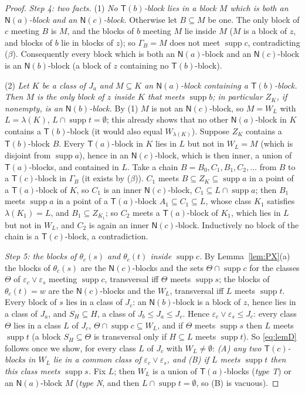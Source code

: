 \documentclass[11pt]{amsart}
\theoremstyle{definition}
\newcommand{\supp}{\operatorname{supp}}
\newcommand{\T}{\mathsf{T}}
\newcommand{\N}{\mathsf{N}}
\begin{document}
\begin{proof}
\emph{Step 4: two facts.} (1) \emph{No $\T(b)$-block lies in a block $M$ which is both an $\N(a)$-block and an $\N(c)$-block.} Otherwise let $B\subseteq M$ be one. The only block of $c$ meeting $B$ is $M$, and the blocks of $b$ meeting $M$ lie inside $M$ ($M$ is a block of $z$, and blocks of $b$ lie in blocks of $z$); so $\Gamma_B=M$ does not meet $\supp c$, contradicting ($\beta$). Consequently every block which is both an $\N(a)$-block and an $\N(c)$-block is an $\N(b)$-block (a block of $z$ containing no $\T(b)$-block).

(2) \emph{Let $K$ be a class of $J_a$ and $M\subseteq K$ an $\N(a)$-block containing a $\T(b)$-block. Then $M$ is the only block of $z$ inside $K$ that meets $\supp b$; in particular $Z_K$, if nonempty, is an $\N(b)$-block.} By (1) $M$ is not an $\N(c)$-block, so $M=W_L$ with $L=\lambda(K)$, $L\cap\supp t=\emptyset$; this already shows that no other $\N(a)$-block in $K$ contains a $\T(b)$-block (it would also equal $W_{\lambda(K)}$). Suppose $Z_K$ contains a $\T(b)$-block $B$. Every $\T(a)$-block in $K$ lies in $L$ but not in $W_L=M$ (which is disjoint from $\supp a$), hence in an $\N(c)$-block, which is then inner, a union of $\T(a)$-blocks, and contained in $L$. Take a chain $B=B_0,C_1,B_1,C_2,\dots$ from $B$ to a $\T(c)$-block in $\Gamma_B$ (it exists by ($\beta$)). $C_1$ meets $B\subseteq Z_K\subseteq\supp a$ in a point of a $\T(a)$-block of $K$, so $C_1$ is an inner $\N(c)$-block, $C_1\subseteq L\cap\supp a$; then $B_1$ meets $\supp a$ in a point of a $\T(a)$-block $A_1\subseteq C_1\subseteq L$, whose class $K_1$ satisfies $\lambda(K_1)=L$, and $B_1\subseteq Z_{K_1}$; so $C_2$ meets a $\T(a)$-block of $K_1$, which lies in $L$ but not in $W_L$, and $C_2$ is again an inner $\N(c)$-block. Inductively no block of the chain is a $\T(c)$-block, a contradiction.

\emph{Step 5: the blocks of $\theta_c(s)$ and $\theta_c(t)$ inside $\supp c$.} By Lemma~\ref{lem:PX}(a) the blocks of $\theta_c(s)$ are the $\N(c)$-blocks and the sets $\Theta\cap\supp c$ for the classes $\Theta$ of $\varepsilon_c\vee\varepsilon_s$ meeting $\supp c$, transversal iff $\Theta$ meets $\supp s$; the blocks of $\theta_c(t)=w$ are the $\N(c)$-blocks and the $W_L$, transversal iff $L$ meets $\supp t$. Every block of $s$ lies in a class of $J_c$: an $\N(b)$-block is a block of $z$, hence lies in a class of $J_a$, and $S_H\subseteq H$, a class of $J_b\le J_a\le J_c$. Hence $\varepsilon_c\vee\varepsilon_s\le J_c$: every class $\Theta$ lies in a class $L$ of $J_c$, $\Theta\cap\supp c\subseteq W_L$, and if $\Theta$ meets $\supp s$ then $L$ meets $\supp t$ (a block $S_H\subseteq\Theta$ is transversal only if $H\subseteq L$ meets $\supp t$). So \eqref{eq:lemD} follows once we show, for every class $L$ of $J_c$ with $W_L\ne\emptyset$: \emph{(A) any two $\T(c)$-blocks in $W_L$ lie in a common class of $\varepsilon_c\vee\varepsilon_s$, and (B) if $L$ meets $\supp t$ then this class meets $\supp s$.} Fix $L$; then $W_L$ is a union of $\T(a)$-blocks (\emph{type T}) or an $\N(a)$-block $M$ (\emph{type N}, and then $L\cap\supp t=\emptyset$, so (B) is vacuous).


\end{proof}
\end{document}
